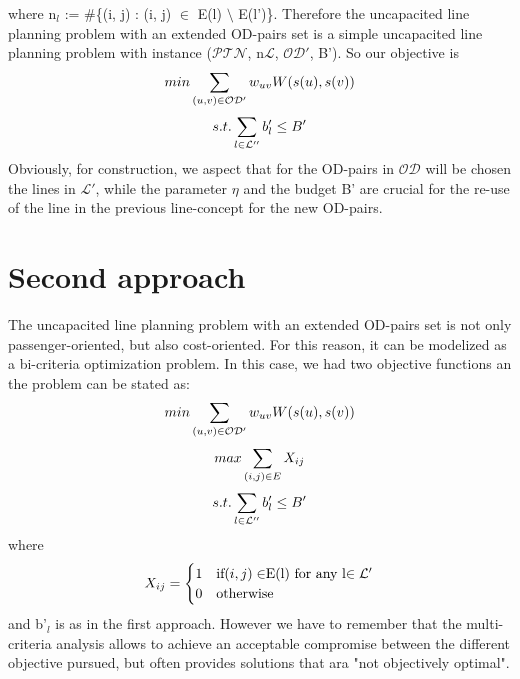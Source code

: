 \documentclass[
  twoside,
  11pt, a4paper,
  footinclude=true,
  headinclude=true,
  cleardoublepage=empty
]{book}
\theoremstyle{definition}
\begin{document}
where n$_l$ := \#\{(i, j) : (i, j) $\in$ E(l) $\setminus$ E(l')\}. \newline
Therefore the uncapacited line planning problem with an extended OD-pairs set is a simple uncapacited line planning problem with instance ($\mathcal{PTN}$, n$\mathcal{L}$, $\mathcal{OD'}$, B'). So our objective is 
\begin{equation} \notag
min \sum_{(u,v)\in\mathcal{OD'}} w_{uv}W(s(u), s(v))
\end{equation}
\begin{equation} \notag
s.t. \sum_{l\in\mathcal{L''}} b'_l \le B'
\end{equation}
Obviously, for construction, we aspect that for the OD-pairs in $\mathcal{OD}$ will be chosen the lines in $\mathcal{L'}$, while the parameter $\eta$ and the budget B' are crucial for the re-use of the line in the previous line-concept  for the new OD-pairs.
\section{Second approach} 
The uncapacited line planning problem with an extended OD-pairs set is not only passenger-oriented, but also cost-oriented. For this reason, it can be modelized as a bi-criteria optimization problem. \newline
In this case, we had two objective functions an the problem can be stated as:
\begin{equation} \notag
min \sum_{(u,v)\in\mathcal{OD'}} w_{uv}W(s(u), s(v))
\end{equation}
\begin{equation} \notag
max \sum_{(i,j)\in E} X_{ij}
\end{equation}
\begin{equation} \notag
s.t. \sum_{l\in\mathcal{L''}} b'_l \le B'
\end{equation}
where 
\[X_{ij}=
\begin{cases}
1 & $if$ (i, j) \in $E(l) for any l$ \in \mathcal{L'} \\
0 & $otherwise$
\end{cases}
\]
and b'$_l$ is as in the first approach. \newline
However we have to remember that the multi-criteria analysis allows to achieve an acceptable compromise between the different objective pursued, but often provides solutions that ara "not objectively optimal".


\cleardoublepage
{}
\printbibliography

    
\end{document}
